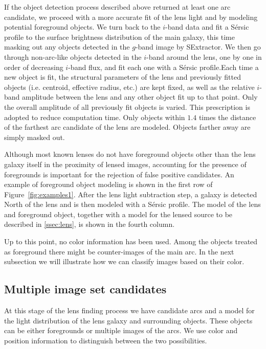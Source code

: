 \documentclass[a4paper,fleqn,usenatbib]{mnras}
\def\Fref#1{Figure~\ref{#1}\xspace}
\begin{document}
If the object detection process described above returned at least one arc candidate, we proceed with a more accurate fit of the lens light and by modeling potential foreground objects.
We turn back to the $i$-band data and fit a S\'{e}rsic profile \citep{Ser68} to the surface brightness distribution of the main galaxy, this time masking out any objects detected in the $g$-band image by SExtractor.
We then go through non-arc-like objects detected in the $i$-band around the lens, one by one in order of decreasing $i$-band flux, and fit each one with a S\'{e}rsic profile.Each time a new object is fit, the structural parameters of the lens and previously fitted objects (i.e. centroid, effective radius, etc.) are kept fixed, as well as the relative $i$-band amplitude between the lens and any other object fit up to that point. Only the overall amplitude of all previously fit objects is varied. 
This prescription is adopted to reduce computation time.
Only objects within $1.4$ times the distance of the farthest arc candidate of the lens are modeled. Objects farther away are simply masked out.%

Although most known lenses do not have foreground objects other than the lens galaxy itself in the proximity of lensed images, accounting for the presence of foregrounds is important for the rejection of false positive candidates.
An example of foreground object modeling is shown in the first row of \Fref{fig:examples1}. After the lens light subtraction step, a galaxy is detected North of the lens and is then modeled with a S\'{e}rsic profile. The model of the lens and foreground object, together with a model for the lensed source to be described in \ref{ssec:lens}, is shown in the fourth column.

Up to this point, no color information has been used. Among the objects treated as foreground there might be counter-images of the main arc. In the next subsection we will illustrate how we can classify images based on their color.



\subsection{Multiple image set candidates}

At this stage of the lens finding process we have candidate arcs and a model for the light distribution of the lens galaxy and surrounding objects.
These objects can be either foregrounds or multiple images of the arcs.
We use color and position information to distinguish between the two possibilities.
\end{document}
